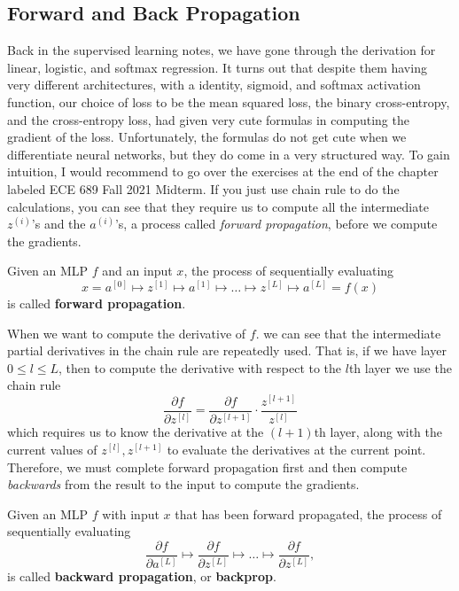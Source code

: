 \subsection{Forward and Back Propagation}

  Back in the supervised learning notes, we have gone through the derivation for linear, logistic, and softmax regression. It turns out that despite them having very different architectures, with a identity, sigmoid, and softmax activation function, our choice of loss to be the mean squared loss, the binary cross-entropy, and the cross-entropy loss, had given very cute formulas in computing the gradient of the loss. Unfortunately, the formulas do not get cute when we differentiate neural networks, but they do come in a very structured way. To gain intuition, I would recommend to go over the exercises at the end of the chapter labeled ECE 689 Fall 2021 Midterm. If you just use chain rule to do the calculations, you can see that they require us to compute all the intermediate $z^{(i)}$'s and the $a^{(i)}$'s, a process called \textit{forward propagation}, before we compute the gradients. 

  \begin{definition}
    Given an MLP $f$ and an input $x$, the process of sequentially evaluating 
    \begin{equation}
      x = a^{[0]} \mapsto z^{[1]} \mapsto a^{[1]} \mapsto \ldots \mapsto z^{[L]} \mapsto a^{[L]} = f(x)
    \end{equation}
    is called \textbf{forward propagation}. 
  \end{definition} 

  When we want to compute the derivative of $f$. we can see that the intermediate partial derivatives in the chain rule are repeatedly used. That is, if we have layer $0 \leq l \leq L$, then to compute the derivative with respect to the $l$th layer we use the chain rule 
  \begin{equation}
    \frac{\partial f}{\partial z^{[l]}} = \frac{\partial f}{\partial z^{[l+1]}} \cdot \frac{z^{[l+1]}}{z^{[l]}}
  \end{equation}
  which requires us to know the derivative at the $(l+1)$th layer, along with the current values of $z^{[l]}, z^{[l+1]}$ to evaluate the derivatives at the current point. Therefore, we must complete forward propagation first and then compute \textit{backwards} from the result to the input to compute the gradients. 

  \begin{definition}
    Given an MLP $f$ with input $x$ that has been forward propagated, the process of sequentially evaluating 
    \begin{equation}
      \frac{\partial f}{\partial a^{[L]}} \mapsto \frac{\partial f}{\partial z^{[L]}} \mapsto \ldots \mapsto \frac{\partial f}{\partial z^{[L]}}, 
    \end{equation}
    is called \textbf{backward propagation}, or \textbf{backprop}. 
  \end{definition}

